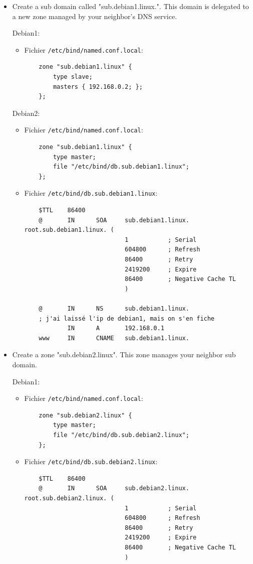 \documentclass[a4paper]{article}
\begin{document}
\begin{itemize}
\item Create a sub domain called "sub.debian1.linux.". This domain is delegated to a new zone managed by your neighbor’s DNS service.
\begin{example}
    Debian1:
    \begin{itemize}
        \item Fichier \texttt{/etc/bind/named.conf.local}:
        \begin{verbatim}
    zone "sub.debian1.linux" {
        type slave;
        masters { 192.168.0.2; };
    };
        \end{verbatim}
    \end{itemize}
    Debian2:
    \begin{itemize}
        \item Fichier \texttt{/etc/bind/named.conf.local}:
        \begin{verbatim}
    zone "sub.debian1.linux" {
        type master;
        file "/etc/bind/db.sub.debian1.linux";
    };
        \end{verbatim}
        \item Fichier \texttt{/etc/bind/db.sub.debian1.linux}:
        \begin{verbatim}
    $TTL    86400
    @       IN      SOA     sub.debian1.linux.    root.sub.debian1.linux. (
                            1           ; Serial
                            604800      ; Refresh
                            86400       ; Retry
                            2419200     ; Expire
                            86400       ; Negative Cache TL
                            )

    @       IN      NS      sub.debian1.linux.
    ; j'ai laissé l'ip de debian1, mais on s'en fiche
            IN      A       192.168.0.1
    www     IN      CNAME   sub.debian1.linux.
        \end{verbatim}
    \end{itemize}
\end{example}

\item Create a zone "sub.debian2.linux". This zone manages your neighbor sub domain.
\begin{example}
    Debian1:
    \begin{itemize}
        \item Fichier \texttt{/etc/bind/named.conf.local}:
        \begin{verbatim}
    zone "sub.debian2.linux" {
        type master;
        file "/etc/bind/db.sub.debian2.linux";
    };
        \end{verbatim}
        \item Fichier \texttt{/etc/bind/db.sub.debian2.linux}:
        \begin{verbatim}
    $TTL    86400
    @       IN      SOA     sub.debian2.linux.    root.sub.debian2.linux. (
                            1           ; Serial
                            604800      ; Refresh
                            86400       ; Retry
                            2419200     ; Expire
                            86400       ; Negative Cache TL
                            )


\end{verbatim}
\end{itemize}
\end{example}
\end{itemize}
\end{document}
